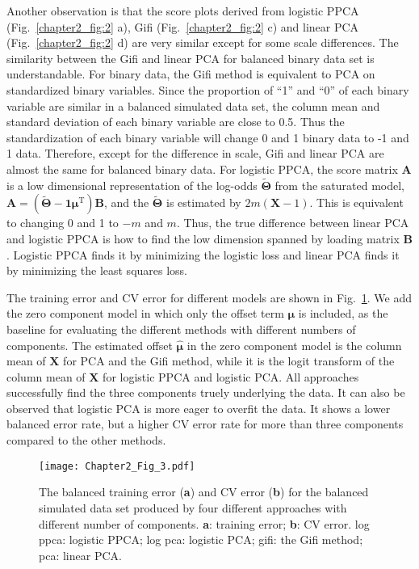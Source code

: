 Another observation is that the score plots derived from logistic PPCA (Fig.~\ref{chapter2_fig:2} a), Gifi (Fig.~\ref{chapter2_fig:2} c) and linear PCA (Fig.~\ref{chapter2_fig:2} d) are very similar except for some scale differences. The similarity between the Gifi and linear PCA for balanced binary data set is understandable. For binary data, the Gifi method is equivalent to PCA on standardized binary variables. Since the proportion of ``1'' and ``0'' of each binary variable are similar in a balanced simulated data set, the column mean and standard deviation of each binary variable are close to 0.5. Thus the standardization of each binary variable will change 0 and 1 binary data to -1 and 1 data. Therefore, except for the difference in scale, Gifi and linear PCA are almost the same for balanced binary data. For logistic PPCA, the score matrix $\mathbf{A}$ is a low dimensional representation of the log-odds $\mathbf{ \widetilde{\Theta } }$ from the saturated model, $\mathbf{A} = (\mathbf{\widetilde{\Theta }}-\mathbf{1}\bm{\mu}^{\text{T}})\mathbf{B}$, and the $\mathbf{ \widetilde{\Theta } }$ is estimated by $2m(\mathbf{X}-1)$. This is equivalent to changing 0 and 1 to $-m$ and $m$. Thus, the true difference between linear PCA and logistic PPCA is how to find the low dimension spanned by loading matrix $\mathbf{B}$. Logistic PPCA finds it by minimizing the logistic loss and linear PCA finds it by minimizing the least squares loss.

The training error and CV error for different models are shown in Fig.~\ref{chapter2_fig:3}. We add the zero component model in which only the offset term $\bm{\mu}$ is included, as the baseline for evaluating the different methods with different numbers of components. The estimated offset $\hat{\bm{\mu}}$ in the zero component model is the column mean of $\mathbf{X}$ for PCA and the Gifi method, while it is the logit transform of the column mean of $\mathbf{X}$ for logistic PPCA and logistic PCA. All approaches successfully find the three components truely underlying the data. It can also be observed that logistic PCA is more eager to overfit the data. It shows a lower balanced error rate, but a higher CV error rate for more than three components compared to the other methods.
\begin{figure}[htbp]
    \centering
    \texttt{[image: Chapter2\_Fig\_3.pdf]}
    \caption{The balanced training error (\textbf{a}) and CV error (\textbf{b}) for the balanced simulated data set produced by four different approaches with different number of components. \textbf{a}: training error; \textbf{b}: CV error. log ppca: logistic PPCA; log pca: logistic PCA; gifi: the Gifi method; pca: linear PCA.}
    \label{chapter2_fig:3}
\end{figure}

